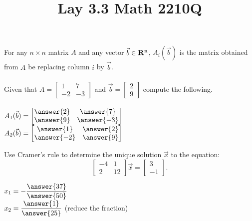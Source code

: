 \documentclass{ximera}
\newcommand{\RR}{\bf R}
\begin{document}
  	\title{Lay 3.3  \hfill Math 2210Q} 

  \begin{question} For any $n\times n$ matrix $A$ and any vector $\vec{b} \in \RR^n$, $A_i(\vec{b})$ is the matrix obtained from $A$ be replacing column $i$ by $\vec{b}$. \\
  	\vspace{10pt}\\
  	Given that $A = \begin{bmatrix} 1& 7\\ -2 &-3\end{bmatrix}$ and $\vec{b} = \begin{bmatrix} 2\\ 9\end{bmatrix}$ compute the following.\\ \\
  	
  	$A_1(\vec{b}) =\begin{bmatrix}
  	\answer{2} &\answer{7}\\
  	\answer{9} & \answer{-3}
  	\end{bmatrix}$\vspace{10pt}\\
  	
  		$A_2(\vec{b}) =\begin{bmatrix}
  		\answer{1} &\answer{2}\\
  		\answer{-2} & \answer{9}
  		\end{bmatrix}$\\
  	
  
  	
  	\end{question}	
     \begin{question} Use Cramer's rule to determine the unique solution $\vec{x}$ to the equation: $$\begin{bmatrix} -4 & 1 \\ 2& 12 \end{bmatrix}\vec{x} = \begin{bmatrix} 3\\-1\end{bmatrix}.$$
     	
     	$x_1=-\dfrac{\answer{37}}{\answer{50}}$\vspace{10pt}\\
     	$x_2=\dfrac{\answer{1}}{\answer{25}}$ (reduce the fraction)\vspace{10pt}\\
   
     	
     	
     	
     \end{question}	
\end{document}
